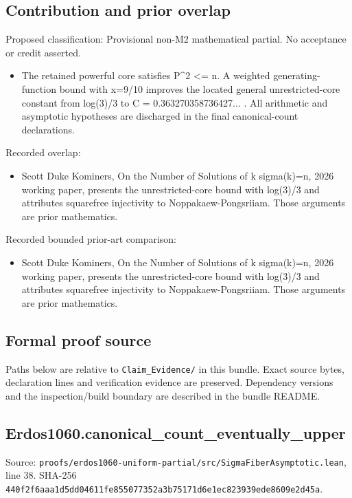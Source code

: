 \documentclass[11pt,a4paper]{article}
\begin{document}
\subsection{Contribution and prior overlap}
Proposed classification: Provisional non-M2 mathematical partial. No acceptance or credit asserted.

\begin{itemize}
\item The retained powerful core satisfies P\textasciicircum{}2 <= n. A weighted generating-function bound with x=9/10 improves the located general unrestricted-core constant from log(3)/3 to C = 0.363270358736427... . All arithmetic and asymptotic hypotheses are discharged in the final canonical-count declarations.
\end{itemize}
Recorded overlap:

\begin{itemize}
\item Scott Duke Kominers, On the Number of Solutions of k sigma(k)=n, 2026 working paper, presents the unrestricted-core bound with log(3)/3 and attributes squarefree injectivity to Noppakaew-Pongsriiam. Those arguments are prior mathematics.
\end{itemize}
Recorded bounded prior-art comparison:

\begin{itemize}
\item Scott Duke Kominers, On the Number of Solutions of k sigma(k)=n, 2026 working paper, presents the unrestricted-core bound with log(3)/3 and attributes squarefree injectivity to Noppakaew-Pongsriiam. Those arguments are prior mathematics.
\end{itemize}
\subsection{Formal proof source}
Paths below are relative to \texttt{Claim\_Evidence/} in this bundle. Exact source bytes, declaration lines and verification evidence are preserved. Dependency versions and the inspection/build boundary are described in the bundle README.

\subsection{Erdos1060.canonical\_count\_eventually\_upper}
Source: \texttt{proofs/erdos1060-uniform-partial/src/SigmaFiberAsymptotic.lean}, line 38. SHA-256 \texttt{440f2f6aaa1d5dd04611fe855077352a3b75171d6e1ec823939ede8609e2d45a}.
\end{document}
